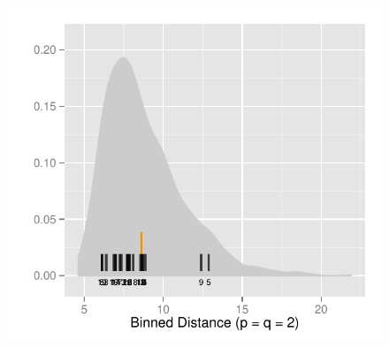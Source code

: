 \documentclass[12]{article}
\begin{document}
\begin{figure}[hbtp]
{\includegraphics[scale=0.67]{distribution-bin-dist-2-2-exp2.pdf}
\label{t2comp_2}
}
\subfigure[]{
}
\end{figure}
\end{document}
